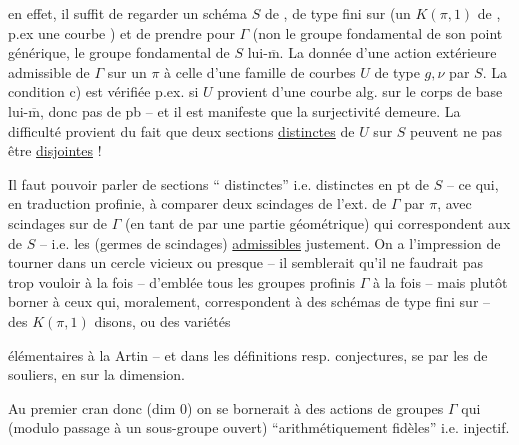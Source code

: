 
en effet, il suffit de regarder un schéma $S$ de , de type fini sur  (un $K(\pi,1)$ de , p.ex une courbe ) et de prendre pour $\Gamma$ (non le groupe fondamental de son point générique,   le groupe fondamental de $S$ lui-$\overline{\mathrm m}$. La donnée d'une action extérieure admissible de $\Gamma$ sur un $\pi$   à celle d'une famille de courbes $U$ de type $g,\nu$  par $S$. La condition c) est vérifiée p.ex. si $U$ provient d'une courbe alg. sur le corps de base lui-$\overline{\mathrm m}$, donc pas de pb -- et il est manifeste que la surjectivité demeure. La difficulté provient du fait que deux sections \uline{distinctes} de $U$ sur $S$ peuvent ne pas être \uline{disjointes} !



Il faut pouvoir parler de sections `` distinctes'' i.e. distinctes en  pt de $S$ -- ce qui, en traduction profinie,  à comparer deux scindages de l'ext. de $\Gamma$ par $\pi$, avec   scindages sur  de $\Gamma$ (en tant  de  par une partie géométrique) qui correspondent aux  de $S$ -- i.e. les (germes de scindages) \uline{admissibles} justement. On a l'impression de tourner dans un cercle vicieux ou presque -- il semblerait qu'il ne faudrait pas trop vouloir  à la fois --  d'emblée tous les groupes profinis $\Gamma$ à la fois -- mais plutôt  borner  à ceux qui, moralement, correspondent à des  schémas de type fini sur  -- des $K(\pi,1)$ disons, ou  des variétés


élémentaires à la Artin -- et dans les définitions resp. conjectures, se  par les  de souliers, en  sur la dimension.

Au premier cran donc (dim $0$) on se bornerait à des actions de groupes $\Gamma$ qui  (modulo  passage à un sous-groupe ouvert) ``arithmétiquement fidèles'' i.e.  injectif.

